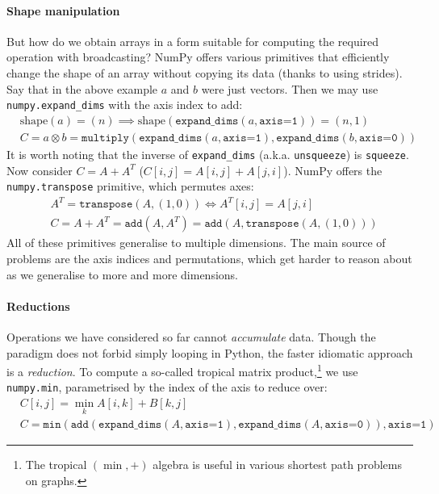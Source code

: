 \paragraph{Shape manipulation} But how do we obtain arrays in a form suitable for computing the required operation with broadcasting? NumPy offers various primitives that efficiently change the shape of an array without copying its data (thanks to using strides). Say that in the above example $a$ and $b$ were just vectors. Then we may use \texttt{numpy.expand\_dims} with the axis index to add:
\begin{align*}
&\mathrm{shape}(a) = (n) \implies \mathrm{shape}(\texttt{expand\_dims}(a, \texttt{axis=1})) = (n, 1) \\
&C = a \otimes b = \texttt{multiply} \left( \texttt{expand\_dims}(a, \texttt{axis=1}), \texttt{expand\_dims}(b, \texttt{axis=0}) \right)
\end{align*}
It is worth noting that the inverse of \texttt{expand\_dims} (a.k.a. \texttt{unsqueeze}) is \texttt{squeeze}. Now consider $C = A + A^T$ ($C[i, j] = A[i, j] + A[j, i]$). NumPy offers the \texttt{numpy.transpose} primitive, which permutes axes:
\begin{align*}
&A^T = \texttt{transpose}(A, (1, 0)) \iff A^T[i, j] = A[j, i] \\
&C = A + A^T = \texttt{add}(A, A^T) = \texttt{add}(A, \texttt{transpose}(A, (1, 0))) 
\end{align*}
All of these primitives generalise to multiple dimensions. 
The main source of problems are the axis indices and permutations, which get harder to reason about as we generalise to more and more dimensions. 

\needspace{3em}
\paragraph{Reductions}
Operations we have considered so far cannot \textit{accumulate} data. Though the paradigm does not forbid simply looping in Python, the faster idiomatic approach is a \textit{reduction}. To compute a so-called tropical matrix product,\footnote{The tropical $(\min, +)$ algebra is useful in various shortest path problems on graphs.} we use \texttt{numpy.min}, parametrised by the index of the axis to reduce over:
\begin{align*}
&C[i, j] = \min_k A[i, k] + B[k, j] \\
&C = \texttt{min} \left( \texttt{add} \left(\texttt{expand\_dims}(A, \texttt{axis=1}), \texttt{expand\_dims}(A, \texttt{axis=0}) \right), \texttt{axis=1} \right)
\end{align*}


